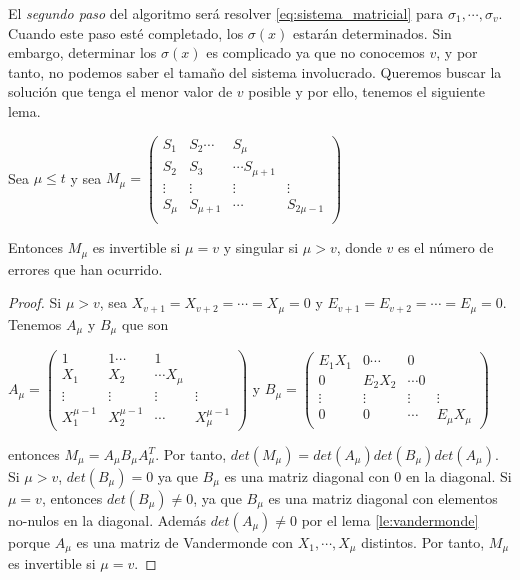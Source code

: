 El \textit{segundo paso} del algoritmo será resolver \ref{eq:sistema_matricial} para $\sigma_1,\cdots,\sigma_v$. Cuando este paso esté completado, los $\sigma(x)$ estarán determinados. Sin embargo, determinar los $\sigma(x)$ es complicado ya que no conocemos $v$, y por tanto, no podemos saber el tamaño del sistema involucrado. Queremos buscar la solución que tenga el menor valor de $v$ posible y por ello, tenemos el siguiente lema.

\begin{lemma}
Sea $\mu \leq t$ y sea 
$M_\mu = \begin{pmatrix}
			S_1 & S_2  \cdots &  S_\mu \\
			S_2 & S_3  & \cdots  S_{\mu+1} \\
 			\vdots & \vdots & \vdots & \vdots  \\
			S_\mu & S_{\mu+1} & \cdots & S_{2\mu-1} \\
	\end{pmatrix}$

Entonces $M_\mu$ es invertible si $\mu = v$ y singular si $\mu > v$, donde $v$ es el número de errores que han ocurrido.
\end{lemma}

\begin{proof}
Si $\mu > v$, sea $X_{v+1} = X_{v+2} = \cdots = X_\mu = 0$ y $E_{v+1} = E_{v+2} = \cdots = E_\mu = 0$. Tenemos $A_\mu$ y $B_\mu$ que son 

$A_\mu = \begin{pmatrix}
			1 & 1  \cdots &  1 \\
			X_1 & X_2  & \cdots  X_\mu \\
 			\vdots & \vdots & \vdots & \vdots  \\
			X_1^{\mu-1} & X_2^{\mu-1} & \cdots & X_\mu^{\mu-1} 
	\end{pmatrix}$ 
	y $B_\mu = \begin{pmatrix}
			E_1X_1 & 0  \cdots &  0 \\
			0 & E_2X_2  & \cdots  0 \\
 			\vdots & \vdots & \vdots & \vdots  \\
			0 & 0 & \cdots & E_\mu X_\mu 
	\end{pmatrix}$

entonces $M_\mu = A_\mu B_\mu A_\mu^T$. Por tanto, $det(M_\mu) = det(A_\mu) det(B_\mu) det(A_\mu)$. Si $\mu > v$, $det(B_\mu) = 0$ ya que $B_\mu$ es una matriz diagonal con $0$ en la diagonal. Si $\mu = v$, entonces $det(B_\mu) \neq 0$, ya que $B_\mu$ es una matriz diagonal con elementos no-nulos en la diagonal. Además $det(A_\mu) \neq 0$ por el lema \ref{le:vandermonde} porque $A_\mu$ es una matriz de Vandermonde con $X_1,\cdots,X_\mu$ distintos. Por tanto, $M_\mu$ es invertible si $\mu = v$.
\end{proof}

